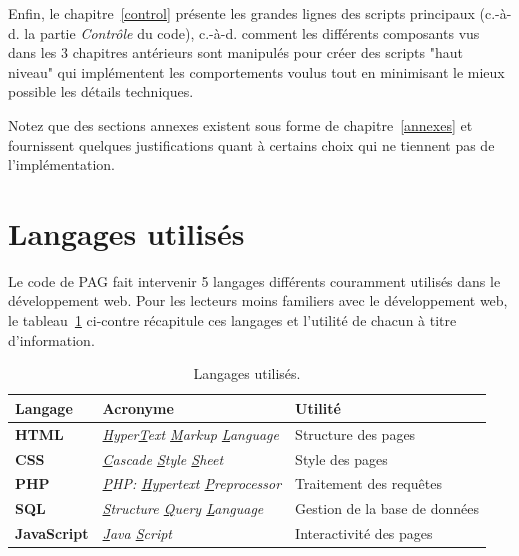 Enfin, le chapitre~\ref{control} présente les grandes lignes des scripts principaux (c.-à-d. la 
partie \textit{Contrôle} du code), c.-à-d. comment les différents composants vus dans les 3 
chapitres antérieurs sont manipulés pour créer des scripts "haut niveau" qui implémentent les 
comportements voulus tout en minimisant le mieux possible les détails techniques.

Notez que des sections annexes existent sous forme de chapitre~\ref{annexes} et fournissent 
quelques justifications quant à certains choix qui ne tiennent pas de l'implémentation.

\section{Langages utilisés}\label{intro.langages}

Le code de PAG fait intervenir 5 langages différents couramment utilisés dans le développement 
web. Pour les lecteurs moins familiers avec le développement web, le 
tableau~\ref{intro.tab.langages} ci-contre récapitule ces langages et l'utilité de chacun à 
titre d'information.

\begin{table}[h]
\begin{center}
\begin{tabular}{|l|l|l|}
  \hline
  \textbf{Langage} & \textbf{Acronyme} & \textbf{Utilité} \\
  \hline
  \textbf{HTML} & \textit{\underline{H}yper\underline{T}ext \underline{M}arkup \underline{L}anguage} & Structure des pages\\
  \hline
  \textbf{CSS} & \textit{\underline{C}ascade \underline{S}tyle \underline{S}heet} & Style des pages\\
  \hline
  \textbf{PHP} & \textit{\underline{P}HP: \underline{H}ypertext \underline{P}reprocessor} & Traitement des requêtes\\
  \hline
  \textbf{SQL} & \textit{\underline{S}tructure \underline{Q}uery \underline{L}anguage} & Gestion de la base de données\\
  \hline
  \textbf{JavaScript} & \textit{\underline{J}ava \underline{S}cript} & Interactivité des pages\\
  \hline
\end{tabular}
\end{center}
\vspace{-0.5cm}
\caption{Langages utilisés.}
\label{intro.tab.langages}
\end{table}

